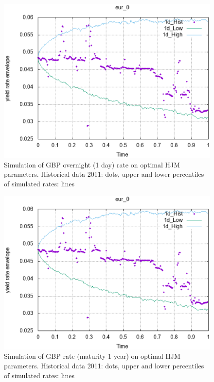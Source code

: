 \documentclass[10pt]{article}
\begin{document}
\begin{figure}[H]
\centering
\includegraphics [width=1\textwidth]{blank.eps}
\caption{Simulation of GBP overnight (1 day) rate on optimal HJM parameters. Historical data 2011: dots, upper and lower percentiles of simulated rates: lines}
\label{gbp0}
\end{figure}

\begin{figure}[H]
\centering
\includegraphics [width=1\textwidth]{blank.eps}
\caption{Simulation of GBP rate (maturity 1 year) on optimal HJM parameters. Historical data 2011: dots, upper and lower percentiles of simulated rates: lines}
\label{gbp2}
\end{figure}
\end{document}
